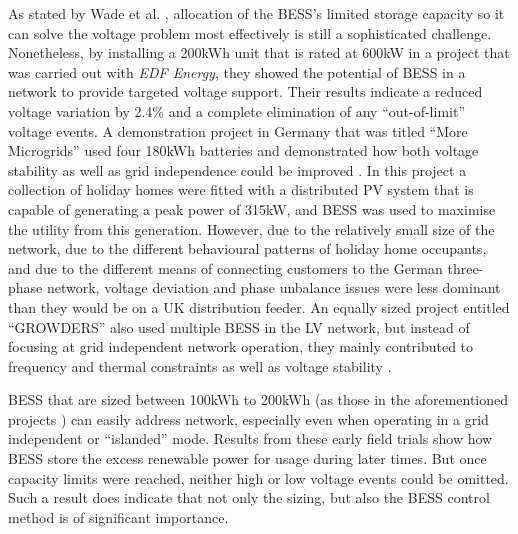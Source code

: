 As stated by Wade et al. \cite{Wade2009, Wade2010}, allocation of the BESS's limited storage capacity so it can solve the voltage problem most effectively is still a sophisticated challenge.
Nonetheless, by installing a 200kWh unit that is rated at 600kW in a project that was carried out with \textit{EDF Energy}, they showed the potential of BESS in a network to provide targeted voltage support.
Their results indicate a reduced voltage variation by 2.4\% and a complete elimination of any ``out-of-limit'' voltage events.
A demonstration project in Germany that was titled ``More Microgrids'' used four 180kWh batteries and demonstrated how both voltage stability as well as grid independence could be improved \cite{Overbeeke2010}.
In this project a collection of holiday homes were fitted with a distributed PV system that is capable of generating a peak power of 315kW, and BESS was used to maximise the utility from this generation.
However, due to the relatively small size of the network, due to the different behavioural patterns of holiday home occupants, and due to the different means of connecting customers to the German three-phase network, voltage deviation and phase unbalance issues were less dominant than they would be on a UK distribution feeder.
An equally sized project entitled ``GROWDERS'' also used multiple BESS in the LV network, but instead of focusing at grid independent network operation, they mainly contributed to frequency and thermal constraints as well as voltage stability \cite{GROWDERS2011}.

BESS that are sized between 100kWh to 200kWh (as those in the aforementioned projects \cite{Wade2010, Wade2009, Overbeeke2010, GROWDERS2011}) can easily address network, especially even when operating in a grid independent or ``islanded'' mode.
Results from these early field trials show how BESS store the excess renewable power for usage during later times.
But once capacity limits were reached, neither high or low voltage events could be omitted.
Such a result does indicate that not only the sizing, but also the BESS control method is of significant importance.


